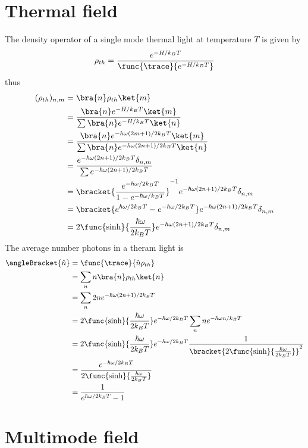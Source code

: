 \section{Thermal field}
The density operator of a single mode thermal light at temperature \(T\) is given by
\begin{equation*}
    \rho_{th} = \dfrac{e^{-H/k_B T}}{\func{\trace}{e^{-H/k_B T}}}
\end{equation*}
thus 
\begin{align*}
    (\rho_{th})_{n,m} &= \bra{n}\rho_{th} \ket{m}\\
    &= \dfrac{\bra{n} e^{-H/k_B T}\ket{m}}{\sum \bra{n} e^{-H/k_B T} \ket{n}}\\
    &= \dfrac{\bra{n} e^{-\hbar\omega(2m + 1) /2k_B T}\ket{m}}{\sum \bra{n} e^{-\hbar\omega(2n+1)/2k_B T} \ket{n}}\\
    &= \dfrac{e^{-\hbar\omega(2n + 1) /2k_B T} \delta_{n,m}}{\sum  e^{-\hbar\omega(2n+1)/2k_B T}}\\
    &= \bracket{\dfrac{e^{-\hbar\omega/2k_BT}}{1- e^{-\hbar\omega/k_BT}}}^{-1} e^{-\hbar\omega(2n + 1) /2k_B T} \delta_{n,m} \\
    &=  \bracket{ e^{\hbar\omega/2k_BT} - e^{-\hbar\omega/2k_BT}} e^{-\hbar\omega(2n + 1) /2k_B T}\delta_{n,m}\\
    &= 2 \func{\sinh}{\dfrac{\hbar\omega}{2 k_B T}} e^{-\hbar\omega(2n + 1) /2k_B T}\delta_{n,m}
\end{align*}
The average number photons in a theram light is 
\begin{align*}
    \angleBracket{\hat{n}} &= \func{\trace}{\hat{n}\rho_{th}}\\
    &= \sum_n n\bra{n} \rho_{th} \ket{n}\\
    &= \sum_n 2 n  e^{-\hbar\omega(2n + 1) /2k_B T}\\
    &= 2\func{\sinh}{\dfrac{\hbar\omega}{2 k_B T}} e^{-\hbar \omega /2k_B T} \sum_n n e^{-\hbar \omega n/k_B T}\\
    &= 2\func{\sinh}{\dfrac{\hbar\omega}{2 k_B T}} e^{-\hbar \omega /2k_B T} \dfrac{1}{\bracket{2 \func{\sinh}{\frac{\hbar\omega}{2k_B T}}}^2}\\
    &= \dfrac{e^{-\hbar \omega /2k_B T} }{2 \func{\sinh}{\frac{\hbar\omega}{2k_B T}}}\\
    &= \dfrac{1}{e^{\hbar\omega/2k_BT} - 1}
\end{align*}

\section{Multimode field}
